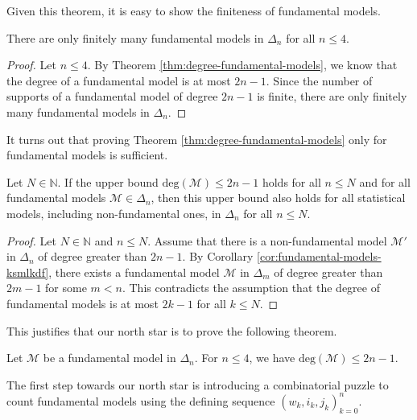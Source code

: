 Given this theorem, it is easy to show the finiteness of fundamental models.

\begin{theorem}\label{thm:finiteness-fundamental-models}
    There are only finitely many fundamental models in \( \Delta_n \) for all \( n \leq 4 \).
\end{theorem}

\begin{proof}
    Let \( n \leq 4 \).
    By Theorem \ref{thm:degree-fundamental-models}, we know that the degree of a fundamental model is at most \( 2n - 1 \). Since the number of supports of a fundamental model of degree \( 2n - 1 \) is finite, there are only finitely many fundamental models in \( \Delta_n \).
\end{proof}

It turns out that proving Theorem \ref{thm:degree-fundamental-models} only for fundamental models is sufficient.

\begin{theorem}\label{thm:degree-fundamental-models-reduced}    
    Let \( N \in \mathbb{N} \). If the upper bound \( \mathrm{deg}(\mathcal{M}) \leq 2n - 1 \) holds for all \( n \leq N \) and for all fundamental models \( \mathcal{M} \in \Delta_n \), then this upper bound also holds for all statistical models, including non-fundamental ones, in \( \Delta_n \) for all \( n \leq N \).
\end{theorem}

\begin{proof}
    Let $N \in \mathbb{N}$ and $n \leq N$.
    Assume that there is a non-fundamental model $\mathcal{M}'$ in $\Delta_n$ of degree greater than $2n - 1$. By Corollary \ref{cor:fundamental-models-ksmlkdf}, there exists a fundamental model $\mathcal{M}$ in $\Delta_m$ of degree greater than $2m - 1$ for some $m < n$. This contradicts the assumption that the degree of fundamental models is at most $2k - 1$ for all $k \leq N$.
\end{proof}

This justifies that our north star is to prove the following theorem.

\begin{theorem}\label{thm:degree-fundamental-models-fundamental}
    Let \( \mathcal{M} \) be a fundamental model in \( \Delta_n \). For \(n \leq 4 \), we have \( \mathrm{deg}(\mathcal{M}) \leq 2n - 1\).
\end{theorem}

The first step towards our north star is introducing a combinatorial puzzle to count fundamental models using the defining sequence \((w_k, i_k, j_k)_{k=0}^{n}\).